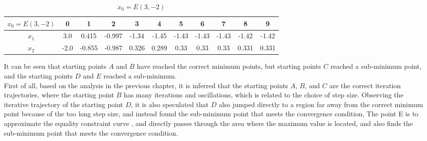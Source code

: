 \begin{table}[H]
\centering
\setlength{\abovecaptionskip}{0cm} 
\setlength{\belowcaptionskip}{-0.5cm} 
\scriptsize
\begin{tabular}{|c|c|c|c|c|c|c|c|c|c|c|}
\hline
$x_0=E(3,-2)$&0&1&2&3&4&5&6&7&8&9\\
\hline
$x_1$&3.0 & 0.415 & -0.997 & -1.34 & -1.45 & -1.43 & -1.43 & -1.43 & -1.42 & -1.42 \\
\hline
$x_2$&-2.0 & -0.855 & -0.987 & 0.326 & 0.289 & 0.33 & 0.33 & 0.33 & 0.331 & 0.331 
\\
\hline
\end{tabular}

\caption{$x_0=E(3,-2)$}
\end{table}
It can be seen that starting points $A$ and $B$ have reached the correct minimum points, but starting points $C$ reached a sub-minimum point, and the starting points $D$ and $E$ reached a sub-minimum.\\
First of all, based on the analysis in the previous chapter, it is inferred that the starting points $A$, $B$, and $C$ are the correct iteration trajectories, where the starting point $B$ has many iterations and oscillations, which is related to the choice of step size.
Observing the iterative trajectory of the starting point $D$, it is also speculated that $D$ also jumped directly to a region far away from the correct minimum point because of the too long step size, and instead found the sub-minimum point that meets the convergence condition,
The point E is to approximate the equality constraint curve , and directly passes through the area where the maximum value is located, and also finds the sub-minimum point that meets the convergence condition.

\newpage
